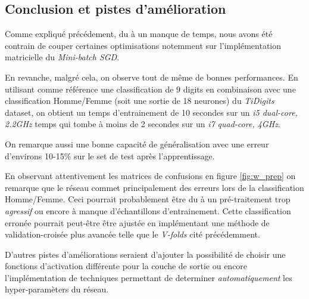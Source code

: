 \documentclass[11pt]{article}
\begin{document}
\subsection{Conclusion et pistes d'am\'elioration}
Comme expliqu\'e pr\'ec\'edement, du \`a un manque de temps, nous avons
\'et\'e contrain de couper certaines optimisations notemment sur
l'impl\'ementation matricielle du {\em Mini-batch SGD}.

En revanche, malgr\'e cela, on observe tout de m\^eme de bonnes performances.
En utilisant comme r\'ef\'erence une classification de 9 digits en combinaison
avec une classification Homme/Femme (soit une sortie de 18 neurones) du
{\em TiDigits} dataset, on obtient un temps d'entrainement de 10 secondes sur un
{\em i5 dual-core, 2.2GHz} temps qui tombe \`a moins de 2 secondes sur un
{\em i7 quad-core, 4GHz}.

On remarque aussi une bonne capacit\'e de g\'en\'eralisation avec une erreur
d'environs 10-15\% sur le set de test apr\`es l'apprentissage.

En observant attentivement les matrices de
confusions en figure \ref{fig:w_prep} on remarque que le r\'eseau commet
principalement des erreurs lors de la classification Homme/Femme. Ceci pourrait
probablement \^etre du \`a un pr\'e-traitement trop {\em agressif} ou encore \`a
manque d'\'echantillons d'entrainement. Cette classification erron\'ee pourrait
peut-\^etre \^etre ajust\'ee en impl\'ementant une m\'ethode de
validation-crois\'ee plus avanc\'ee telle que le {\em V-folds} cit\'e pr\'ec\'edemment.

D'autres pistes d'am\'eliorations seraient d'ajouter la possibilit\'e de choisir une
fonctions d'activation diff\'erente pour la couche de sortie ou encore
l'impl\'ementation de techniques permettant de determiner {\em automatiquement}
les hyper-param\`eters du r\'eseau.
\end{document}

